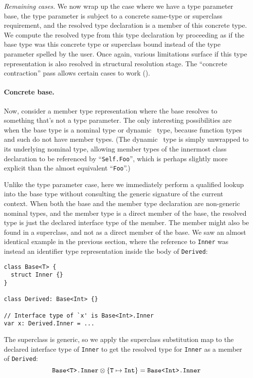 \documentclass[../generics]{subfiles}
\begin{document}
\smallskip

\emph{Remaining cases.} We now wrap up the case where we have a type parameter base, the type parameter is subject to a concrete same-type or superclass requirement, and the resolved type declaration is a member of this concrete type. We compute the resolved type from this type declaration by proceeding as if the base type was this concrete type or superclass bound instead of the type parameter spelled by the user. Once again, various limitations surface if this type representation is also resolved in structural resolution stage. The ``concrete contraction'' pass allows certain cases to work ().

\paragraph{Concrete base.} Now, consider a member type representation where the base resolves to something that's not a type parameter. The only interesting possibilities are when the base type is a nominal type or dynamic \tSelf\ type, because function types and such do not have member types. (The dynamic \tSelf\ type is simply unwrapped to its underlying nominal type, allowing member types of the innermost class declaration to be referenced by ``\texttt{Self.Foo}'', which is perhaps slightly more explicit than the almost equivalent ``\texttt{Foo}''.)

Unlike the type parameter case, here we immediately perform a qualified lookup into the base type without consulting the generic signature of the current context. When both the base and the member type declaration are non-generic nominal types, and the member type is a direct member of the base, the resolved type is just the declared interface type of the member. The member might also be found in a superclass, and not as a direct member of the base. We saw an almost identical example in the previous section, where the reference to \texttt{Inner} was instead an identifier type representation inside the body of \texttt{Derived}:
\begin{Verbatim}
class Base<T> {
  struct Inner {}
}

class Derived: Base<Int> {}

// Interface type of `x' is Base<Int>.Inner
var x: Derived.Inner = ...
\end{Verbatim}
The superclass is generic, so we apply the superclass substitution map to the declared interface type of \texttt{Inner} to get the resolved type for \texttt{Inner} as a member of \texttt{Derived}:
\[\texttt{Base<T>.Inner}\otimes\{\texttt{T} \mapsto \texttt{Int}\}=\texttt{Base<Int>.Inner}\]
\end{document}

